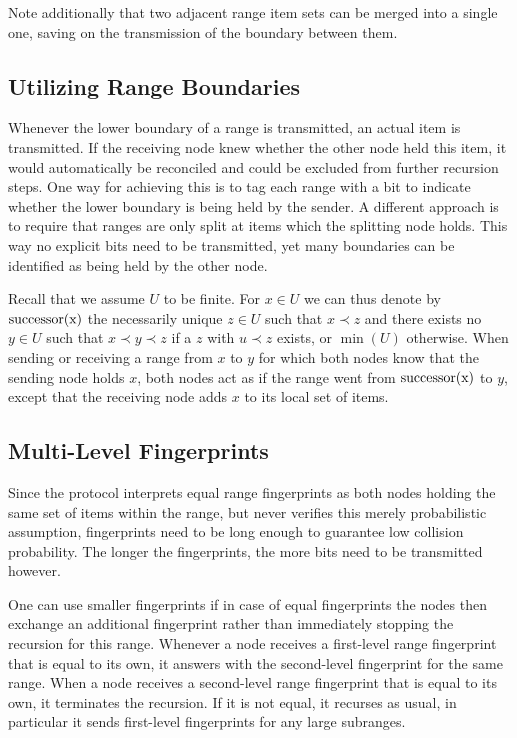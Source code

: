 Note additionally that two adjacent range item sets can be merged into a single one, saving on the transmission of the boundary between them.

\subsection{Utilizing Range Boundaries}

Whenever the lower boundary of a range is transmitted, an actual item is transmitted. If the receiving node knew whether the other node held this item, it would automatically be reconciled and could be excluded from further recursion steps. One way for achieving this is to tag each range with a bit to indicate whether the lower boundary is being held by the sender. A different approach is to require that ranges are only split at items which the splitting node holds. This way no explicit bits need to be transmitted, yet many boundaries can be identified as being held by the other node.

Recall that we assume $U$ to be finite. For $x \in U$ we can thus denote by $\operatorname{successor({x})}$ the necessarily unique $z \in U$ such that $x \prec z$ and there exists no $y \in U$ such that $x \prec y \prec z$ if a $z$ with $u \prec z$ exists, or $\min(U)$ otherwise. When sending or receiving a range from $x$ to $y$ for which both nodes know that the sending node holds $x$, both nodes act as if the range went from $\operatorname{successor({x})}$ to $y$, except that the receiving node adds $x$ to its local set of items.

\subsection{Multi-Level Fingerprints}

Since the protocol interprets equal range fingerprints as both nodes holding the same set of items within the range, but never verifies this merely probabilistic assumption, fingerprints need to be long enough to guarantee low collision probability. The longer the fingerprints, the more bits need to be transmitted however.

One can use smaller fingerprints if in case of equal fingerprints the nodes then exchange an additional fingerprint rather than immediately stopping the recursion for this range. Whenever a node receives a first-level range fingerprint that is equal to its own, it answers with the second-level fingerprint for the same range. When a node receives a second-level range fingerprint that is equal to its own, it terminates the recursion. If it is not equal, it recurses as usual, in particular it sends first-level fingerprints for any large subranges.

